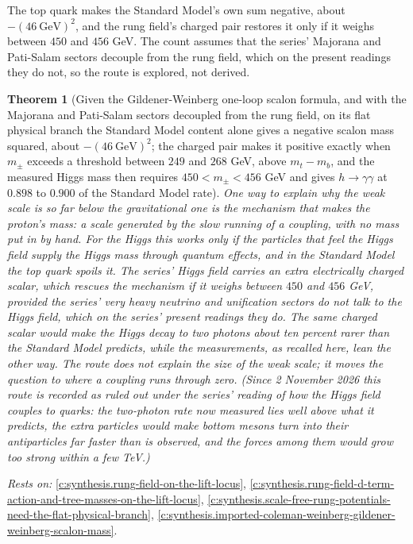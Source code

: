 \documentclass[11pt]{article}
\newtheorem{theorem}{Theorem}[section]
\theoremstyle{definition}
\theoremstyle{plain}
\begin{document}
The top quark makes the Standard Model's own sum negative, about $-(46\ \mathrm{GeV})^{2}$, and the rung field's charged pair restores it only if it weighs between $450$ and $456$ GeV. The count assumes that the series' Majorana and Pati-Salam sectors decouple from the rung field, which on the present readings they do not, so the route is explored, not derived.

\begin{theorem}[Given the Gildener-Weinberg one-loop scalon formula, and with the Majorana and Pati-Salam sectors decoupled from the rung field, on its flat physical branch the Standard Model content alone gives a negative scalon mass squared, about $-(46\ \mathrm{GeV})^{2}$; the charged pair makes it positive exactly when $m_{\pm}$ exceeds a threshold between $249$ and $268$ GeV, above $m_{t} - m_{b}$, and the measured Higgs mass then requires $450 < m_{\pm} < 456$ GeV and gives $h \to \gamma\gamma$ at $0.898$ to $0.900$ of the Standard Model rate]\label{c:synthesis.transmutation-of-the-rung-field-needs-a-charged-pair-near-450-gev}
One way to explain why the weak scale is so far below the gravitational one is the mechanism that makes the proton's mass: a scale generated by the slow running of a coupling, with no mass put in by hand. For the Higgs this works only if the particles that feel the Higgs field supply the Higgs mass through quantum effects, and in the Standard Model the top quark spoils it. The series' Higgs field carries an extra electrically charged scalar, which rescues the mechanism if it weighs between $450$ and $456$ GeV, provided the series' very heavy neutrino and unification sectors do not talk to the Higgs field, which on the series' present readings they do. The same charged scalar would make the Higgs decay to two photons about ten percent rarer than the Standard Model predicts, while the measurements, as recalled here, lean the other way. The route does not explain the size of the weak scale; it moves the question to where a coupling runs through zero. (Since 2 November 2026 this route is recorded as ruled out under the series' reading of how the Higgs field couples to quarks: the two-photon rate now measured lies well above what it predicts, the extra particles would make bottom mesons turn into their antiparticles far faster than is observed, and the forces among them would grow too strong within a few TeV.)
\end{theorem}
\noindent\emph{Rests on:} \ref{c:synthesis.rung-field-on-the-lift-locus}, \ref{c:synthesis.rung-field-d-term-action-and-tree-masses-on-the-lift-locus}, \ref{c:synthesis.scale-free-rung-potentials-need-the-flat-physical-branch}, \ref{c:synthesis.imported-coleman-weinberg-gildener-weinberg-scalon-mass}.
\end{document}

